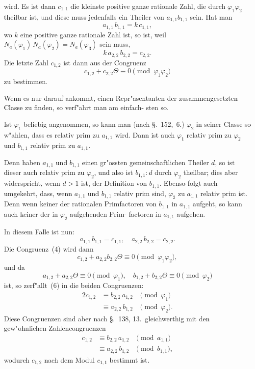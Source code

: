 \documentclass[12pt,a4paper]{article}
\theoremstyle{weber}
\begin{document}
wird. Es ist dann $c_{1,1}$ die kleinste positive ganze rationale Zahl,
die durch $\varphi_1\varphi_2$ theilbar ist, und diese muss jedenfalls ein Theiler
von $a_{1,1}b_{1,1}$ sein. Hat man
\[
a_{1,1}\,b_{1,1} = k\,c_{1,1},
\]
wo $k$ eine positive ganze rationale Zahl ist, so ist, weil
$N_a(\varphi_1)\,N_a(\varphi_2) = N_a(\varphi_3)$ sein muss,
\[
k\,a_{2,2}\,b_{2,2} = c_{2,2}.
\]
Die letzte Zahl $c_{1,2}$ ist dann aus der Congruenz
\begin{equation}\label{eq:s168-4}
c_{1,2} + c_{2,2}\varTheta \equiv 0 \pmod{\varphi_1\varphi_2}
\end{equation}
zu bestimmen.

Wenn es nur darauf ankommt, einen Repr"asentanten der
zusammengesetzten Classe zu finden, so verf"ahrt man am einfach-
sten so.

Ist $\varphi_1$ beliebig angenommen, so kann man (nach \S.~152,~6.) $\varphi_2$
in seiner Classe so w"ahlen, dass es relativ prim zu $a_{1,1}$ wird.
Dann ist auch $\varphi_1$ relativ prim zu $\varphi_2$ und $b_{1,1}$ relativ prim zu $a_{1,1}$.

Denn haben $a_{1,1}$ und $b_{1,1}$ einen gr"ossten gemeinschaftlichen
Theiler $d$, so ist dieser auch relativ prim zu $\varphi_2$, und also ist
$b_{1,1} : d$ durch $\varphi_2$ theilbar; dies aber widerspricht, wenn $d > 1$
ist, der Definition von $b_{1,1}$. Ebenso folgt auch umgekehrt, dass,
wenn $a_{1,1}$ und $b_{1,1}$ relativ prim sind, $\varphi_2$ zu $a_{1,1}$ relativ prim ist.
Denn wenn keiner der rationalen Primfactoren von $b_{1,1}$ in $a_{1,1}$
aufgeht, so kann auch keiner der in $\varphi_2$ aufgehenden Prim-
factoren in $a_{1,1}$ aufgehen.

In diesem Falle ist nun:
\begin{equation}\label{eq:s168-5}
a_{1,1}\,b_{1,1} = c_{1,1}, \quad a_{2,2}\,b_{2,2} = c_{2,2}.
\end{equation}
Die Congruenz~(4) wird dann
\begin{equation}\label{eq:s168-6}
c_{1,2} + a_{2,2}b_{2,2}\varTheta \equiv 0 \pmod{\varphi_1\varphi_2},
\end{equation}
und da
\[
a_{1,2} + a_{2,2}\varTheta \equiv 0 \pmod{\varphi_1}, \quad b_{1,2} + b_{2,2}\varTheta \equiv 0 \pmod{\varphi_2}
\]
ist, so zerf"allt~(6) in die beiden Congruenzen:
\begin{alignat*}{2}
c_{1,2} &\equiv b_{2,2}\,a_{1,2} &\pmod{\varphi_1} \\
        &\equiv a_{2,2}\,b_{1,2} &\pmod{\varphi_2}.
\end{alignat*}
Diese Congruenzen sind aber nach \S.~138, 13.\ gleichwerthig mit
den gew"ohnlichen Zahlencongruenzen
\begin{equation}\label{eq:s168-7}
\begin{alignedat}{2}
c_{1,2} &\equiv b_{2,2}\,a_{1,2} &\pmod{a_{1,1}} \\
        &\equiv a_{2,2}\,b_{1,2} &\pmod{b_{1,1}},
\end{alignedat}
\end{equation}
wodurch $c_{1,2}$ nach dem Modul $c_{1,1}$ bestimmt ist.
\end{document}
